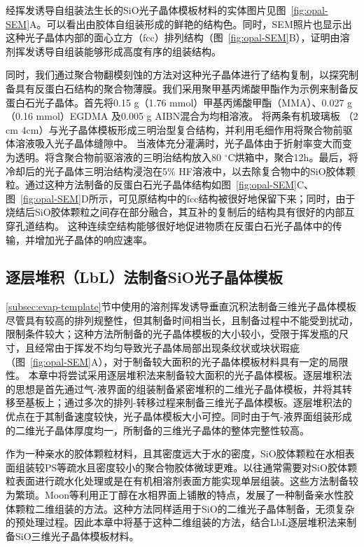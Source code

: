 经挥发诱导自组装法生长的SiO光子晶体模板材料的实体图片见图~\ref{fig:opal-SEM}A。可以看出由胶体自组装形成的鲜艳的结构色。同时，SEM照片也显示出这种光子晶体内部的面心立方（fcc）排列结构（图~\ref{fig:opal-SEM}B），证明由溶剂挥发诱导自组装能够形成高度有序的组装结构。

同时，我们通过聚合物翻模刻蚀的方法对这种光子晶体进行了结构复制，以探究制备具有反蛋白石结构的聚合物薄膜。我们采用聚甲基丙烯酸甲酯作为示例来制备反蛋白石光子晶体。首先将0.15 g（1.76 mmol）甲基丙烯酸甲酯（MMA）、0.027 g（0.16 mmol）EGDMA 及0.005 g AIBN混合为均相溶液。
将两条有机玻璃板 （2 cm \text{$\times$} 4cm）与光子晶体模板形成三明治型复合结构，并利用毛细作用将聚合物前驱体溶液吸入光子晶体缝隙中。
当液体充分灌满时，光子晶体由于折射率变大而变为透明。将含聚合物前驱溶液的三明治结构放入80 $^{\circ}$C烘箱中，聚合12h。最后，将冷却后的光子晶体三明治结构浸泡在5\% HF溶液中，以去除复合物中的SiO胶体颗粒。通过这种方法制备的反蛋白石光子晶体结构如图~\ref{fig:opal-SEM}C、图~\ref{fig:opal-SEM}D所示，可见原结构中的fcc结构被很好地保留下来；同时，由于烧结后SiO胶体颗粒之间存在部分融合，其互补的复制后的结构具有很好的内部互穿孔道结构。
这种连续空结构能够很好地促进物质在反蛋白石光子晶体中的传输，并增加光子晶体的响应速率。

\subsection{逐层堆积（LbL）法制备SiO光子晶体模板}
\label{subsec:lbl-opal}

\ref{subsec:evap-template}节中使用的溶剂挥发诱导垂直沉积法制备三维光子晶体模板尽管具有较高的排列规整性，但其制备时间相当长，且制备过程中不能受到扰动，限制条件较大；这种方法所制备的光子晶体模板的大小较小，受限于挥发瓶的尺寸，且经常由于挥发不均匀导致光子晶体局部出现条纹状或块状瑕疵（图~\ref{fig:opal-SEM}A），对于制备较大面积的光子晶体模板材料具有一定的局限性。
本章中将尝试采用逐层堆积法来制备较大面积的光子晶体模板。逐层堆积法的思想是首先通过气-液界面的组装制备紧密堆积的二维光子晶体模板，并将其转移至基板上；通过多次的排列-转移过程来制备三维光子晶体模板。逐层堆积法的优点在于其制备速度较快，光子晶体模板大小可控。同时由于气-液界面组装形成的二维光子晶体厚度均一，所制备的三维光子晶体的整体完整性较高。

作为一种亲水的胶体颗粒材料，且其密度远大于水的密度，SiO胶体颗粒在水相表面组装较PS等疏水且密度较小的聚合物胶体微球更难。以往通常需要对SiO胶体颗粒表面进行疏水化处理或是在有机相溶剂表面方能实现单层组装\cite{Velikov2002LayerByLayer,Chitu2010Modified}。这些方法制备较为繁琐。Moon等利用正丁醇在水相界面上铺散的特点，发展了一种制备亲水性胶体颗粒二维组装的方法\cite{Moon2011Assembled}。这种方法同样适用于SiO的二维光子晶体制备，无须复杂的预处理过程。因此本章中将基于这种二维组装的方法，结合LbL逐层堆积法来制备SiO三维光子晶体模板材料。

